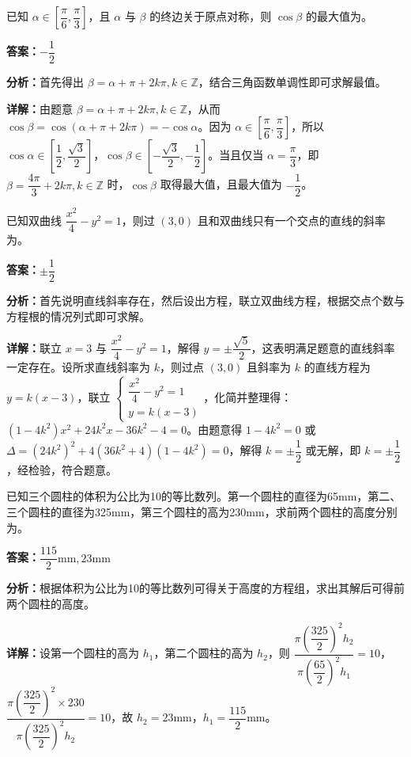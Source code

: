 \begin{question}[points=5]
已知 $\alpha \in \left[\dfrac{\pi}{6},\dfrac{\pi}{3}\right]$，且 $\alpha$ 与 $\beta$ 的终边关于原点对称，则 $\cos \beta$ 的最大值为。
\fillin[{$-\dfrac{1}{2}$}]
\begin{solution}
\textbf{答案：}$-\dfrac{1}{2}$

\textbf{分析：}首先得出 $\beta = \alpha + \pi + 2k\pi, k \in \mathbb{Z}$，结合三角函数单调性即可求解最值。

\textbf{详解：}由题意 $\beta = \alpha + \pi + 2k\pi, k \in \mathbb{Z}$，从而 $\cos \beta = \cos(\alpha+\pi+2k\pi) = -\cos \alpha$。因为 $\alpha \in [\dfrac{\pi}{6},\dfrac{\pi}{3}]$，所以 $\cos \alpha \in [\dfrac{1}{2},\dfrac{\sqrt{3}}{2}]$，$\cos \beta \in [-\dfrac{\sqrt{3}}{2},-\dfrac{1}{2}]$。当且仅当 $\alpha = \dfrac{\pi}{3}$，即 $\beta = \dfrac{4\pi}{3} + 2k\pi, k \in \mathbb{Z}$ 时，$\cos \beta$ 取得最大值，且最大值为 $-\dfrac{1}{2}$。
\end{solution}
\end{question}

\begin{question}[points=5]
已知双曲线 $\dfrac{x^2}{4} - y^2 = 1$，则过 $(3,0)$ 且和双曲线只有一个交点的直线的斜率为。
\fillin[{$\pm \dfrac{1}{2}$}]
\begin{solution}
\textbf{答案：}$\pm \dfrac{1}{2}$

\textbf{分析：}首先说明直线斜率存在，然后设出方程，联立双曲线方程，根据交点个数与方程根的情况列式即可求解。

\textbf{详解：}联立 $x=3$ 与 $\dfrac{x^2}{4} - y^2 = 1$，解得 $y = \pm \dfrac{\sqrt{5}}{2}$，这表明满足题意的直线斜率一定存在。设所求直线斜率为 $k$，则过点 $(3,0)$ 且斜率为 $k$ 的直线方程为 $y = k(x-3)$，联立 $\begin{cases} \dfrac{x^2}{4} - y^2 = 1 \\ y = k(x-3) \end{cases}$，化简并整理得：$(1-4k^2)x^2 + 24k^2x - 36k^2 - 4 = 0$。由题意得 $1-4k^2 = 0$ 或 $\Delta = (24k^2)^2 + 4(36k^2+4)(1-4k^2) = 0$，解得 $k = \pm \dfrac{1}{2}$ 或无解，即 $k = \pm \dfrac{1}{2}$，经检验，符合题意。
\end{solution}
\end{question}

\begin{question}[points=5]
已知三个圆柱的体积为公比为10的等比数列。第一个圆柱的直径为65mm，第二、三个圆柱的直径为325mm，第三个圆柱的高为230mm，求前两个圆柱的高度分别为。
\begin{solution}
\textbf{答案：}$\dfrac{115}{2}\text{mm},23\text{mm}$

\textbf{分析：}根据体积为公比为10的等比数列可得关于高度的方程组，求出其解后可得前两个圆柱的高度。

\textbf{详解：}设第一个圆柱的高为 $h_1$，第二个圆柱的高为 $h_2$，则 $\dfrac{\pi\left(\dfrac{325}{2}\right)^2 h_2}{\pi\left(\dfrac{65}{2}\right)^2 h_1} = 10$，$\dfrac{\pi\left(\dfrac{325}{2}\right)^2 \times 230}{\pi\left(\dfrac{325}{2}\right)^2 h_2} = 10$，故 $h_2 = 23\text{mm}$，$h_1 = \dfrac{115}{2}\text{mm}$。
\end{solution}
\end{question}

